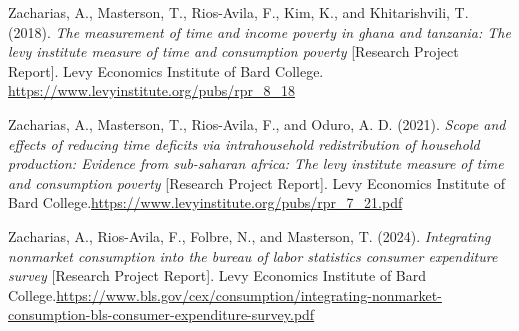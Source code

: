 \documentclass[
  11pt,
]{article}
\newlength{\cslhangindent}
\newenvironment{CSLReferences}[2] %
 {\begin{list}{}{%
  \setlength{\itemindent}{0pt}
  \setlength{\leftmargin}{0pt}
  \setlength{\parsep}{0pt}
  \ifodd #1
   \setlength{\leftmargin}{\cslhangindent}
   \setlength{\itemindent}{-1\cslhangindent}
  \fi
  \setlength{\itemsep}{#2\baselineskip}}}
 {\end{list}}
\begin{document}
\begin{CSLReferences}{1}{0}
Zacharias, A., Masterson, T., Rios-Avila, F., Kim, K., and
Khitarishvili, T. (2018). \emph{The measurement of time and income
poverty in ghana and tanzania: The levy institute measure of time and
consumption poverty} {[}Research Project Report{]}. Levy Economics
Institute of Bard College.
\url{https://www.levyinstitute.org/pubs/rpr_8_18}

Zacharias, A., Masterson, T., Rios-Avila, F., and Oduro, A. D. (2021).
\emph{Scope and effects of reducing time deficits via intrahousehold
redistribution of household production: Evidence from sub-saharan
africa: The levy institute measure of time and consumption poverty}
{[}Research Project Report{]}. Levy Economics Institute of Bard
College.\href{\%20https://www.levyinstitute.org/pubs/rpr_7_21.pdf}{https://www.levyinstitute.org/pubs/rpr\_7\_21.pdf}

Zacharias, A., Rios-Avila, F., Folbre, N., and Masterson, T. (2024).
\emph{Integrating nonmarket consumption into the bureau of labor
statistics consumer expenditure survey} {[}Research Project Report{]}.
Levy Economics Institute of Bard
College.\href{\%20https://www.bls.gov/cex/consumption/integrating-nonmarket-consumption-bls-consumer-expenditure-survey.pdf}{https://www.bls.gov/cex/consumption/integrating-nonmarket-consumption-bls-consumer-expenditure-survey.pdf}

\end{CSLReferences}
\end{document}

